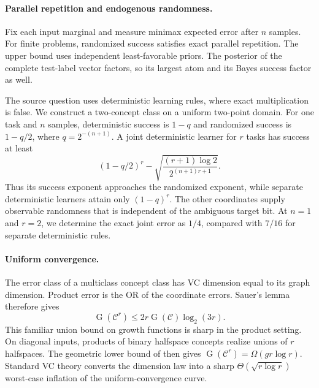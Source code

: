 \documentclass[twoside]{article}
\newcommand{\G}{\operatorname{G}}
\newcommand{\cC}{\mathcal C}
\begin{document}
\paragraph{Parallel repetition and endogenous randomness.} Fix each input marginal and measure minimax expected error after $n$ samples. For finite problems, randomized success satisfies exact parallel repetition. The upper bound uses independent least-favorable priors. The posterior of the complete test-label vector factors, so its largest atom and its Bayes success factor as well.

The source question uses deterministic learning rules, where exact multiplication is false. We construct a two-concept class on a uniform two-point domain. For one task and $n$ samples, deterministic success is $1-q$ and randomized success is $1-q/2$, where $q=2^{-(n+1)}$. A joint deterministic learner for $r$ tasks has success at least \[ (1-q/2)^r-\sqrt{\frac{(r+1)\log 2}{2^{(n+1)r+1}}}. \] Thus its success exponent approaches the randomized exponent, while separate deterministic learners attain only $(1-q)^r$. The other coordinates supply observable randomness that is independent of the ambiguous target bit. At $n=1$ and $r=2$, we determine the exact joint error as $1/4$, compared with $7/16$ for separate deterministic rules.

\paragraph{Uniform convergence.} The error class of a multiclass concept class has VC dimension equal to its graph dimension. Product error is the OR of the coordinate errors. Sauer's lemma therefore gives
\[ \G(\cC^r)\leq 2r\G(\cC)\log_2(3r). \] This familiar union bound on growth functions is sharp in the product setting. On diagonal inputs, products of binary halfspace concepts realize unions of $r$ halfspaces. The geometric lower bound of \citet{csikos2019} then gives $\G(\cC^r)=\Omega(gr\log r)$. Standard VC theory converts the dimension law into a sharp $\Theta(\sqrt{r\log r})$ worst-case inflation of the uniform-convergence curve.
\end{document}
